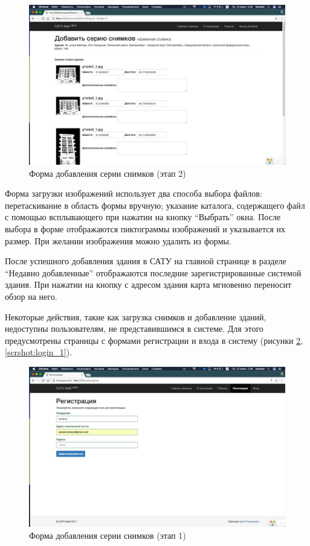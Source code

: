 	\begin{figure}[t!]
		\centering
		\includegraphics[width=1\textwidth]{images/scrshots/add-series_2}
		\caption{Форма добавления серии снимков (этап 2)}
		\label{scrshot:add-series_2}
	\end{figure}
 
	Форма загрузки изображений использует два способа выбора файлов: перетаскивание в область формы вручную; указание каталога, содержащего файл с помощью всплывающего при нажатии на кнопку “Выбрать” окна. После выбора в форме отображаются пиктограммы изображений и указывается их размер. При желании изображения можно удалить из формы.

	После успешного добавления здания в САТУ на главной странице в разделе “Недавно добавленные” отображаются последние зарегистрированные системой здания. При нажатии на кнопку с адресом здания карта мгновенно переносит обзор на него.
 
	Некоторые действия, такие как загрузка снимков и добавление зданий, недоступны пользователям, не представившимся в системе. Для этого предусмотрены страницы с формами регистрации и входа в систему (рисунки \ref{scrshot:register_1}, \ref{scrshot:login_1}).

	\begin{figure}[t!]
		\centering
		\includegraphics[width=1\textwidth]{images/scrshots/register_1}
		\caption{Форма добавления серии снимков (этап 1)}
		\label{scrshot:register_1}
	\end{figure}

